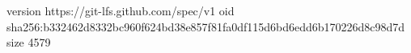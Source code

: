 version https://git-lfs.github.com/spec/v1
oid sha256:b332462d8332bc960f624bd38e857f81fa0df115d6bd6edd6b170226d8c98d7d
size 4579
